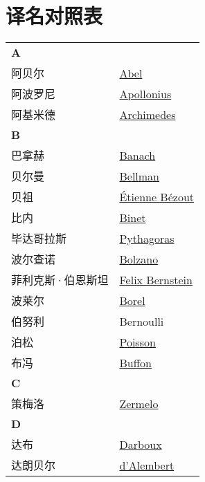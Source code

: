 \chapter{译名对照表}
\def\InsertTable#1{\begin{longtable}{ll} #1 \end{longtable}}%
\InsertTable{
	\textbf{A} \\
	阿贝尔 & \href{https://mathshistory.st-andrews.ac.uk/Biographies/Abel/}{Abel} \\
	阿波罗尼 & \href{https://mathshistory.st-andrews.ac.uk/Biographies/Apollonius/}{Apollonius} \\
	阿基米德 & \href{https://mathshistory.st-andrews.ac.uk/Biographies/Archimedes/}{Archimedes} \\
	\textbf{B} \\
	巴拿赫 & \href{https://mathshistory.st-andrews.ac.uk/Biographies/Banach/}{Banach} \\
	贝尔曼 & \href{https://mathshistory.st-andrews.ac.uk/Biographies/Bellman/}{Bellman} \\
	贝祖 & \href{https://mathshistory.st-andrews.ac.uk/Biographies/Bezout/}{\'Etienne B\'ezout} \\
	比内 & \href{https://mathshistory.st-andrews.ac.uk/Biographies/Binet/}{Binet} \\
	毕达哥拉斯 & \href{https://mathshistory.st-andrews.ac.uk/Biographies/Pythagoras/}{Pythagoras} \\
	波尔查诺 & \href{https://mathshistory.st-andrews.ac.uk/Biographies/Bolzano/}{Bolzano} \\
	菲利克斯·伯恩斯坦 & \href{https://mathshistory.st-andrews.ac.uk/Biographies/Bernstein_Felix/}{Felix Bernstein} \\
	波莱尔 & \href{https://mathshistory.st-andrews.ac.uk/Biographies/Borel/}{Borel} \\
	伯努利 & Bernoulli \\
	泊松 & \href{https://mathshistory.st-andrews.ac.uk/Biographies/Poisson/}{Poisson} \\
	布冯 & \href{https://mathshistory.st-andrews.ac.uk/Biographies/Buffon/}{Buffon} \\
	\textbf{C} \\
	策梅洛 & \href{https://mathshistory.st-andrews.ac.uk/Biographies/Zermelo/}{Zermelo} \\
	\textbf{D} \\
	达布 & \href{https://mathshistory.st-andrews.ac.uk/Biographies/Darboux/}{Darboux} \\
	达朗贝尔 & \href{https://mathshistory.st-andrews.ac.uk/Biographies/DAlembert/}{d'Alembert} \\
}
